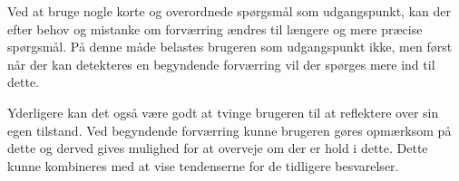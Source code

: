 Ved at bruge nogle korte og overordnede spørgsmål som udgangspunkt, kan der efter behov og mistanke om forværring ændres til længere og mere præcise spørgsmål.
På denne måde belastes brugeren som udgangspunkt ikke, men først når der kan detekteres en begyndende forværring vil der spørges mere ind til dette.

Yderligere kan det også være godt at tvinge brugeren til at reflektere over sin egen tilstand.
Ved begyndende forværring kunne brugeren gøres opmærksom på dette og derved gives mulighed for at overveje om der er hold i dette.
Dette kunne kombineres med at vise tendenserne for de tidligere besvarelser.
